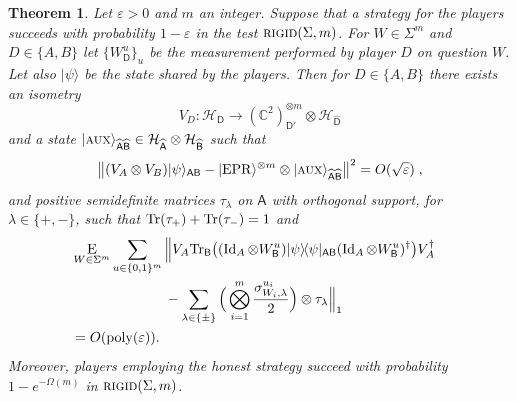\documentclass[11pt]{article}
\newtheorem{theorem}{Theorem}
\newcommand{\ket}[1]{|#1\rangle}
\newcommand{\bra}[1]{\langle#1|}
\newcommand{\proj}[1]{\ket{#1}\!\bra{#1}}
\newcommand{\Tr}{\mbox{\rm Tr}}
\newcommand{\Id}{\ensuremath{\mathop{\rm Id}\nolimits}}
\DeclareMathOperator{\poly}{poly}
\newcommand{\reg}[1]{{\textsf{#1}}}
\newcommand{\C}{\ensuremath{\mathbb{C}}}
\newcommand{\mH}{\mathcal{H}}
\newcommand{\eps}{\varepsilon}
\newcommand{\EPR}{{\rm EPR}}
\newcommand{\aux}{\textsc {aux}}
\newcommand{\rigid}{\textsc{rigid}}
\begin{document}
\begin{theorem}\label{thm:clifford-rigid}
Let $\eps>0$ and $m$ an integer. Suppose that a strategy for the players succeeds with probability $1-\eps$ in the test $\rigid(\Sigma,m)$. 
For $W\in\Sigma^m$ and $D\in\{A,B\}$ let $\{W^u_\reg{D}\}_u$ be the measurement performed by player $D$ on question $W$. Let also $\ket{\psi}$ be the state shared by the players.
Then for $D\in\{A,B\}$ there exists an isometry 
$$V_D: \mathcal{H}_\reg{D} \to (\C^2)^{\otimes m}_{\reg{D}'} \otimes {\mH}_{\widehat{\reg{D}}}$$
and a state  $\ket{\aux}_{\widehat{\reg{A}}\widehat{\reg{B}}} \in {\mH}_{\widehat{\reg{A}}}\otimes {\mH}_{\widehat{\reg{B}}}$
such that
\begin{equation}
 \big\| (V_A \otimes V_B) \ket{\psi}_{\reg{AB}}  - \ket{\EPR}^{\otimes m} \otimes \ket{\aux}_{\widehat{\reg{A}}\widehat{\reg{B}}} \big\|^2 = O(\sqrt{\eps})\;,
\end{equation}
and positive semidefinite matrices $\tau_\lambda$ on $\widehat{\reg{A}}$ with orthogonal support, for $\lambda\in\{+,-\}$, such that $\Tr(\tau_+)+\Tr(\tau_-)=1$ and
\begin{align}
  &\mathop{\textsc{E}}_{W\in\Sigma^m} \sum_{u\in\{0,1\}^{m}} \Big\|V_A
  \Tr_{\reg{B}}\big((\Id_A \otimes W_{\reg{B}}^u) \proj{\psi}_{\reg{AB}} (\Id_A
  \otimes W_{\reg{B}}^u)^\dagger\big) V_A^\dagger \notag\\
  &\;\;\;\;\;\;\;\;\;\;\;\;\;\;\;\;\;\;\;\;\;\;\;\;- \sum_{\lambda\in\{\pm\}} \Big( \bigotimes_{i=1}^m \frac{\sigma_{W_{i},\lambda}^{u_{i}}}{2}\Big)\otimes \tau_\lambda  \Big\|_1\notag\\
  &= O(\poly(\eps)).&\label{eq:rigid-4}
\end{align}
Moreover, players employing the honest strategy succeed with probability $1-e^{-\Omega(m)}$ in $\rigid(\Sigma,m)$.  
\end{theorem}
\end{document}
